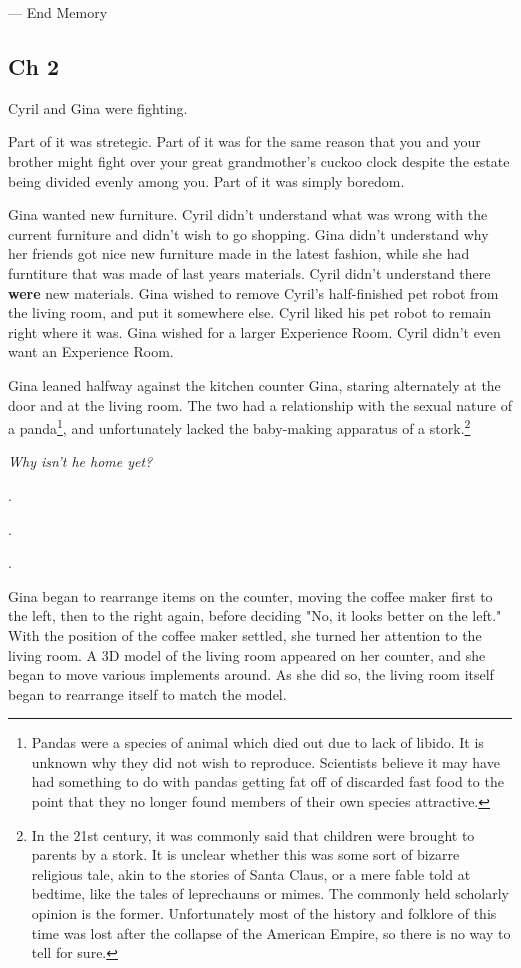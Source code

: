\documentclass[12pt]{article}
\begin{document}
--- End Memory
\subsection*{Ch 2}
\label{sec:orge2a6dac}

Cyril and Gina were fighting. 

Part of it was stretegic. Part of it was for the same reason that you and your brother might fight over your great grandmother's cuckoo clock despite the estate being divided evenly among you. Part of it was simply boredom.

Gina wanted new furniture. Cyril didn't understand what was wrong with the current furniture and didn't wish to go shopping. Gina didn't understand why her friends got nice new furniture made in the latest fashion, while she had furntiture that was made of last years materials. Cyril didn't understand there \textbf{were} new materials. Gina wished to remove Cyril's half-finished pet robot from the living room, and put it somewhere else. Cyril liked his pet robot to remain right where it was. Gina wished for a larger Experience Room. Cyril didn't even want an Experience Room.

Gina leaned halfway against the kitchen counter Gina, staring alternately at the door and at the living room. The two had a relationship with the sexual nature of a panda\footnote{Pandas were a species of animal which died out due to lack of libido. It is unknown why they did not wish to reproduce. Scientists believe it may have had something to do with pandas getting fat off of discarded fast food to the point that they no longer found members of their own species attractive.}, and unfortunately lacked the baby-making apparatus of a stork.\footnote{In the 21st century, it was commonly said that children were brought to parents by a stork. It is unclear whether this was some sort of bizarre religious tale, akin to the stories of Santa Claus, or a mere fable told at bedtime, like the tales of leprechauns or mimes. The commonly held scholarly opinion is the former. Unfortunately most of the history and folklore of this time was lost after the collapse of the American Empire, so there is no way to tell for sure.}

\emph{Why isn't he home yet?}

.

.

.

Gina began to rearrange items on the counter, moving the coffee maker first to the left, then to the right again, before deciding "No, it looks better on the left." With the position of the coffee maker settled, she turned her attention to the living room. A 3D model of the living room appeared on her counter, and she began to move various implements around. As she did so, the living room itself began to rearrange itself to match the model.
\end{document}
